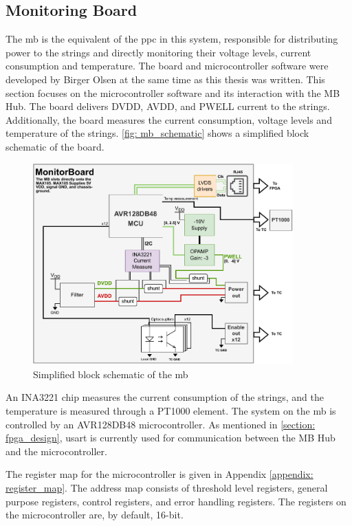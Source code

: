 \documentclass[main.tex]{subfiles}
\begin{document}
\subsection{Monitoring Board}
\label{ssec: microcontroller}
The \gls{mb} is the equivalent of the \gls{ppc} in this system, responsible for distributing power to the strings and directly monitoring their voltage levels, current consumption and temperature. The board and microcontroller software were developed by Birger Olsen at the same time as this thesis was written. This section focuses on the microcontroller software and its interaction with the MB Hub. The board delivers DVDD, AVDD, and PWELL current to the strings. Additionally, the board measures the current consumption, voltage levels and temperature of the strings. \autoref{fig: mb_schematic} shows a simplified block schematic of the board.

\begin{figure}[!htpb]
    \centering
    \includegraphics[width=10cm, scale=1]{images/MonitorBoardBlockSchematic.pdf}
    \caption{Simplified block schematic of the \gls{mb}\cite{birger}}
    \label{fig: mb_schematic}
\end{figure}
\FloatBarrier

 An INA3221 chip measures the current consumption of the strings, and the temperature is measured through a PT1000 element. The system on the \gls{mb} is controlled by an AVR128DB48 microcontroller. As mentioned in \autoref{section: fpga_design}, \acrshort{usart} is currently used for communication between the MB Hub and the microcontroller.

The register map for the microcontroller is given in Appendix \ref{appendix: register_map}. The address map consists of threshold level registers, general purpose registers, control registers, and error handling registers. The registers on the microcontroller are, by default, 16-bit.
\end{document}
